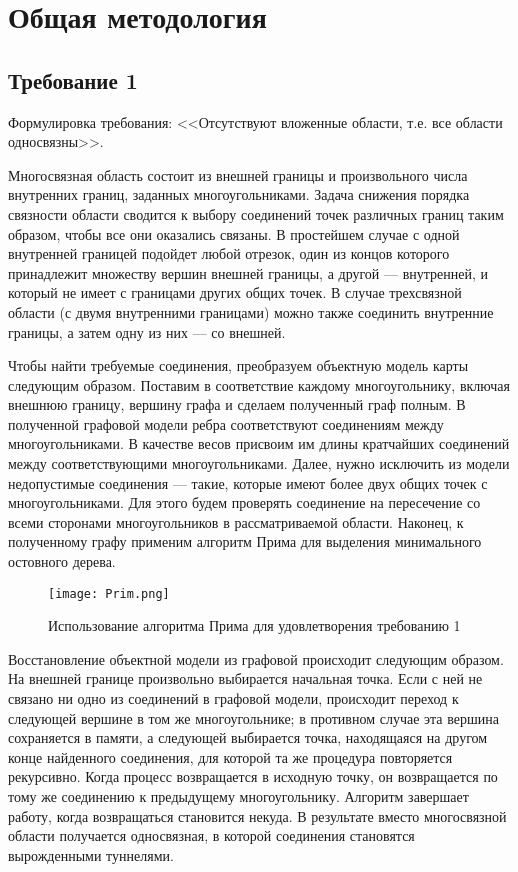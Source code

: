 \section{Общая методология}
\label{method}

\subsection{Требование 1}
\label{task1}

Формулировка требования: <<Отсутствуют вложенные области, т.е. все области односвязны>>.

Многосвязная область состоит из внешней границы и произвольного числа внутренних границ, заданных многоугольниками. Задача снижения порядка связности области сводится к выбору соединений точек различных границ таким образом, чтобы все они оказались связаны. В простейшем случае с одной внутренней границей подойдет любой отрезок, один из концов которого принадлежит множеству вершин внешней границы, а другой --- внутренней, и который не имеет с границами других общих точек. В случае трехсвязной области (с двумя внутренними границами) можно также соединить внутренние границы, а затем одну из них --- со внешней.

Чтобы найти требуемые соединения, преобразуем объектную модель карты следующим образом. Поставим в соответствие каждому многоугольнику, включая внешнюю границу, вершину графа и сделаем полученный граф полным. В полученной графовой модели ребра соответствуют соединениям между многоугольниками. В качестве весов присвоим им длины кратчайших соединений между соответствующими многоугольниками. Далее, нужно исключить из модели недопустимые соединения --- такие, которые имеют более двух общих точек с многоугольниками. Для этого будем проверять соединение на пересечение со всеми сторонами многоугольников в рассматриваемой области. Наконец, к полученному графу применим алгоритм Прима \cite{prim_shortest_1957} для выделения минимального остовного дерева.

\begin{figure}[h]
    \centering
    \texttt{[image: Prim.png]}
    \caption{Использование алгоритма Прима для удовлетворения требованию 1}
    \label{fig:prim}
\end{figure}

Восстановление объектной модели из графовой происходит следующим образом. На внешней границе произвольно выбирается начальная точка. Если с ней не связано ни одно из соединений в графовой модели, происходит переход к следующей вершине в том же многоугольнике; в противном случае эта вершина сохраняется в памяти, а следующей выбирается точка, находящаяся на другом конце найденного соединения, для которой та же процедура повторяется рекурсивно. Когда процесс возвращается в исходную точку, он возвращается по тому же соединению к предыдущему многоугольнику. Алгоритм завершает работу, когда возвращаться становится некуда. В результате вместо многосвязной области получается односвязная, в которой соединения становятся вырожденными туннелями.

